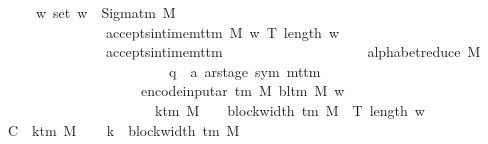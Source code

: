 \begin{isabellebody}
\ \ \ \ \ {\isachardoublequoteopen}{\isasymforall}w{\isachardot}{\kern0pt}\ set\ w\ {\isasymsubseteq}\ Sigma{\isacharunderscore}{\kern0pt}tm\ M\isanewline
\ \ \ \ \ \ \ \ \ \ \ \ \ \ {\isasymlongrightarrow}\ accepts{\isacharunderscore}{\kern0pt}in{\isacharunderscore}{\kern0pt}time{\isacharunderscore}{\kern0pt}mttm\ M\ w\ {\isacharparenleft}{\kern0pt}T\ {\isacharparenleft}{\kern0pt}length\ w{\isacharparenright}{\kern0pt}{\isacharparenright}{\kern0pt}\isanewline
\ \ \ \ \ \ \ \ \ \ \ \ \ \ {\isasymlongrightarrow}\ accepts{\isacharunderscore}{\kern0pt}in{\isacharunderscore}{\kern0pt}time{\isacharunderscore}{\kern0pt}mttm\isanewline
\ \ \ \ \ \ \ \ \ \ \ \ \ \ \ \ \ \ \ \ {\isacharparenleft}{\kern0pt}alphabet{\isacharunderscore}{\kern0pt}reduce\ M\isanewline
\ \ \ \ \ \ \ \ \ \ \ \ \ \ \ \ \ \ \ \ \ \ \ {\isacharcolon}{\kern0pt}{\isacharcolon}{\kern0pt}\ {\isacharparenleft}{\kern0pt}{\isacharprime}{\kern0pt}q\ {\isasymtimes}\ {\isacharprime}{\kern0pt}a\ ar{\isacharunderscore}{\kern0pt}stage{\isacharcomma}{\kern0pt}\ sym{}{\isacharparenright}{\kern0pt}\ mttm{\isacharparenright}{\kern0pt}\isanewline
\ \ \ \ \ \ \ \ \ \ \ \ \ \ \ \ \ \ \ \ {\isacharparenleft}{\kern0pt}encode{\isacharunderscore}{\kern0pt}input{\isacharunderscore}{\kern0pt}ar\ {\isacharparenleft}{\kern0pt}{\isasymGamma}{\isacharunderscore}{\kern0pt}tm\ M{\isacharparenright}{\kern0pt}\ {\isacharparenleft}{\kern0pt}bl{\isacharunderscore}{\kern0pt}tm\ M{\isacharparenright}{\kern0pt}\ w{\isacharparenright}{\kern0pt}\isanewline
\ \ \ \ \ \ \ \ \ \ \ \ \ \ \ \ \ \ \ \ {\isacharparenleft}{\kern0pt}{\isacharparenleft}{\kern0pt}{}\ {\isacharasterisk}{\kern0pt}\ k{\isacharunderscore}{\kern0pt}tm\ M\ {\isacharplus}{\kern0pt}\ {}{\isacharparenright}{\kern0pt}\ {\isacharasterisk}{\kern0pt}\ block{\isacharunderscore}{\kern0pt}width\ {\isacharparenleft}{\kern0pt}{\isasymGamma}{\isacharunderscore}{\kern0pt}tm\ M{\isacharparenright}{\kern0pt}\ {\isacharasterisk}{\kern0pt}\ T\ {\isacharparenleft}{\kern0pt}length\ w{\isacharparenright}{\kern0pt}{\isacharparenright}{\kern0pt}{\isachardoublequoteclose}\isanewline
%
\isadelimproof
%
\endisadelimproof
%
\isatagproof
{}\isamarkupfalse%
\ {\isacharminus}{\kern0pt}\isanewline
\ \ \isamarkupfalse%
\ {\isacharquery}{\kern0pt}C\ {\isacharequal}{\kern0pt}\ {\isachardoublequoteopen}k{\isacharunderscore}{\kern0pt}tm\ M{\isachardoublequoteclose}\isanewline
\ \ \isamarkupfalse%
\ {\isacharquery}{\kern0pt}k\ {\isacharequal}{\kern0pt}\ {\isachardoublequoteopen}block{\isacharunderscore}{\kern0pt}width\ {\isacharparenleft}{\kern0pt}{\isasymGamma}{\isacharunderscore}{\kern0pt}tm\ M{\isacharparenright}{\kern0pt}{\isachardoublequoteclose}\isanewline

\end{isabellebody}
